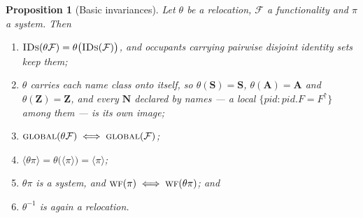 \documentclass[11pt,a4paper]{article}
\newcommand{\PID}{\mathit{pid}}
\newcommand{\admits}{\mathbf{N}}
\newcommand{\Apid}{\mathbf{A}}
\newcommand{\Zpid}{\mathbf{Z}}
\newcommand{\Spid}{\mathbf{S}}
\newcommand{\WF}{\op{wf}}
\newcommand{\F}{\mathcal{F}}
\newcommand{\op}[1]{\textsc{#1}}
\newcommand{\IDs}{\op{IDs}}
\newcommand{\parent}{\mathord{\uparrow}}
\newcommand{\ncl}[1]{\langle #1 \rangle}
\theoremstyle{accentdef}
\theoremstyle{accentplain}
\newtheorem{proposition}[definition]{Proposition}
\begin{document}
\begin{proposition}[Basic invariances]\label{prop:relocbasic}
Let $\theta$ be a relocation, $\F$ a functionality and $\pi$ a system. Then
\begin{enumerate}[label=(\roman*),leftmargin=2.2em]
  \item $\IDs(\theta\F) = \theta\bigl(\IDs(\F)\bigr)$, and occupants carrying pairwise disjoint
        identity sets keep them;
  \item $\theta$ carries each name class onto itself, so $\theta(\Spid) = \Spid$,
        $\theta(\Apid) = \Apid$ and $\theta(\Zpid) = \Zpid$, and every $\admits$ declared by names
        --- a local $\{\PID : \PID.F = F^{\parent}\}$ among them --- is its own image;
  \item $\op{global}(\theta\F) \iff \op{global}(\F)$;
  \item $\ncl{\theta\pi} = \theta\bigl(\ncl{\pi}\bigr) = \ncl{\pi}$;
  \item $\theta\pi$ is a system, and $\WF(\pi) \iff \WF(\theta\pi)$; and
  \item $\theta^{-1}$ is again a relocation.
\end{enumerate}
\end{proposition}
\end{document}
